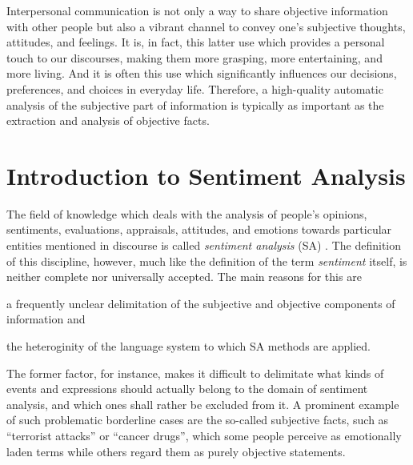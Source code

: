 

Interpersonal communication is not only a way to share objective
information with other people but also a vibrant channel to convey
one's subjective thoughts, attitudes, and feelings.  It is, in fact,
this latter use which provides a personal touch to our discourses,
making them more grasping, more entertaining, and more living.  And it
is often this use which significantly influences our decisions,
preferences, and choices in everyday life.  Therefore, a high-quality
automatic analysis of the subjective part of information is typically
as important as the extraction and analysis of objective facts.

\section{Introduction to Sentiment Analysis}

The field of knowledge which deals with the analysis of people's
opinions, sentiments, evaluations, appraisals, attitudes, and emotions
towards particular entities mentioned in discourse is called
\emph{sentiment analysis} (SA) \citep{Liu:12}.  The definition of this
discipline, however, much like the definition of the term
\emph{sentiment} itself, is neither complete nor universally accepted.
The main reasons for this are
\begin{inparaenum}
  \item a frequently unclear delimitation of the subjective and
    objective components of information and
  \item the heteroginity of the language system to which SA methods
    are applied.
\end{inparaenum}

The former factor, for instance, makes it difficult to delimitate what
kinds of events and expressions should actually belong to the domain
of sentiment analysis, and which ones shall rather be excluded from
it.  A prominent example of such problematic borderline cases are the
so-called subjective facts, such as ``terrorist attacks'' or ``cancer
drugs'', which some people perceive as emotionally laden terms while
others regard them as purely objective statements.

